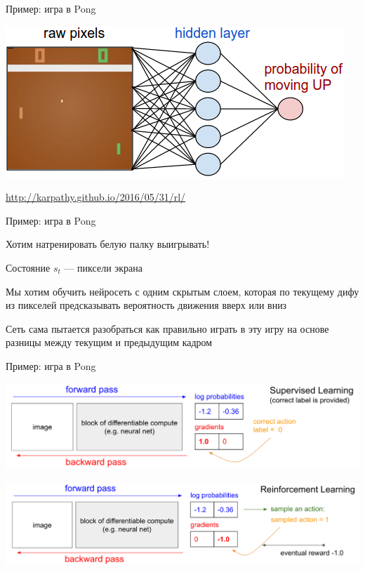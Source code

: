 \documentclass[notes,12pt, aspectratio=169]{beamer}
\newenvironment{wideitemize}{\itemize\addtolength{\itemsep}{10pt}}{\enditemize}
\begin{document}
\begin{frame}{Пример: игра в Pong}
\begin{center}
	\includegraphics[width=.6\linewidth]{pong_NN.png}
\end{center}
\vfill
{\color{blue}  \url{http://karpathy.github.io/2016/05/31/rl/}}
\end{frame}


\begin{frame}{Пример: игра в Pong}
\begin{wideitemize}
	\item  Хотим натренировать белую палку выигрывать! 
	
	\item  Состояние $s_t$ --- пиксели экрана
	
	\item Мы хотим обучить нейросеть с одним скрытым слоем, которая по текущему дифу из пикселей предсказывать вероятность движения вверх или вниз 
	
	\item Сеть сама пытается разобраться как правильно играть в эту игру на основе разницы между текущим и предыдущим кадром 
\end{wideitemize}
\end{frame}


\begin{frame}{Пример: игра в Pong}
\begin{center}
	\includegraphics[width=.8\linewidth]{pong_label.png}
\end{center}
\vfill \pause 
\begin{center}
	\includegraphics[width=.8\linewidth]{pong_sample.png}
\end{center}
\end{frame}
\end{document}

